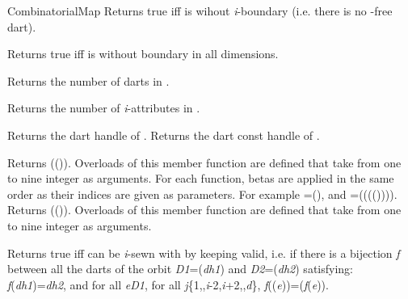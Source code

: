 \begin{ccRefConcept}{CombinatorialMap}
         {Returns true iff  is wihout \emph{i}-boundary
          (i.e. there is no -free dart).
          }

         {Returns true iff  is without boundary in all dimensions.}

    {Returns the number of darts in .}

   {Returns the number of \emph{i}-attributes in . 
     }

    {Returns the dart handle of .}
\ccGlue
{}
    {Returns the dart const handle of .}

{Returns \betaj{}(\betai{}()). 
 Overloads of this member function are defined that take from one to nine integer as arguments.
 For each function, betas are applied in the same order as their indices are given as parameters. 
 For example =\betaun{}(),
 and =\betazero{}(\betatrois{}(\betadeux{}(\betaun{}()))).}
\ccGlue
{}
{Returns \betaj{}(\betai{}()).
  Overloads of this member function are defined that take from one to nine integer as arguments.}

         {Returns true iff  can be \emph{i}-sewn with  by 
           keeping  valid, i.e. if there is
           a bijection \emph{f} between all the darts of the orbit
           \emph{D1}=\orbit{\betaun{},\myldots{},\betaimdeux{},\betaipdeux{},\myldots{},\betad{}}(\emph{dh1}) and
           \emph{D2}=\orbit{\betaun{},\myldots{},\betaimdeux{},\betaipdeux{},\myldots{},\betad{}}(\emph{dh2})
           satisfying: \emph{f}(\emph{dh1})=\emph{dh2}, and for all \emph{e}\myin{}\emph{D1}, for all \emph{j}\myin{}\{1,\myldots{},\emph{i}-2,\emph{i}+2,\myldots{},\emph{d}\},
           \emph{f}(\betaj{}(\emph{e}))=\betajinv{}(\emph{f}(\emph{e})).           
           }	


\end{ccRefConcept}
